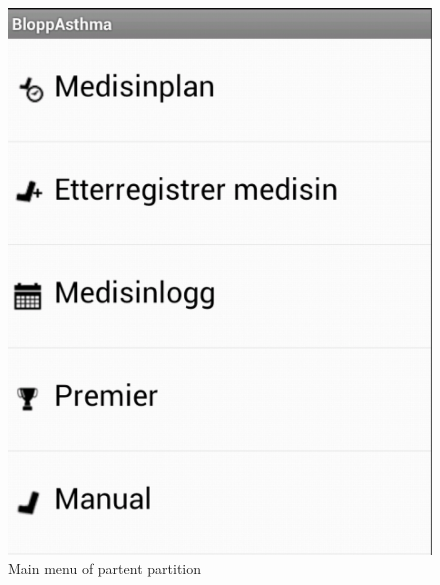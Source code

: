 \begin{figure}
	\begin{minipage}[b]{0.4\linewidth}
		\centering
			\includegraphics[width=0.20\paperwidth]{Pictures/app-screenshots/parent_main_menu.png}
		\caption{Main menu of partent partition}
		\label{fig:parent_main_menu}
	\end{minipage}
	\begin{minipage}[b]{0.4\linewidth}
		\centering

\end{minipage}
\end{figure}
